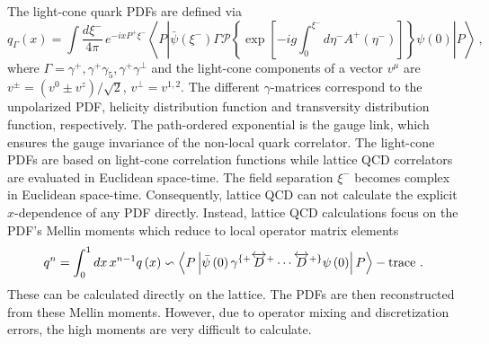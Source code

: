 \documentclass[english,preprint,aps,prd,showpacs,superscriptaddress,nofootinbib,tightenlines]{revtex4}
\begin{document}
The light-cone quark PDFs are defined via~\cite{Collins:1981uw}
\begin{equation}
q_{\Gamma}\left(x\right)=\int\frac{d\xi^{-}}{4\pi}\,e^{-ixP^{+}\xi^{-}}\left\langle P\left|\bar{\psi}\left(\xi^{-}\right)\Gamma\mathcal{P}\left\{ \exp\left[-ig\int_{0}^{\xi^{-}}d\eta^{-}A^{+}(\eta^{-})\right]\right\} \psi\left(0\right)\right|P\right\rangle~,
\end{equation}
where $\Gamma=\gamma^{+},\gamma^{+}\gamma_{5},\gamma^{+}\gamma^{\perp}$ and the light-cone components of a vector $v^\mu$ are {$v^\pm=\left(v^0\pm v^z\right)/\sqrt{2}$, $v^\perp=v^{1,2}$.} The different $\gamma$-matrices
correspond to the unpolarized PDF, helicity distribution function
and transversity distribution function, respectively. The path-ordered exponential
is the gauge link, which ensures the gauge invariance of the non-local quark correlator. The
light-cone PDFs are based on light-cone correlation functions while
 lattice QCD correlators are evaluated in Euclidean space-time.    The field separation
$\xi^{-}$ becomes complex in Euclidean space-time. Consequently, lattice
QCD can not calculate  the explicit $x$-dependence of any PDF directly.
Instead, lattice QCD calculations focus on the PDF's Mellin
moments which reduce to local operator matrix elements
\begin{equation}
q^{n}=\int_{0}^{1}dx\,x^{n-1}q\left(x\right)\backsim\left\langle P\left|\bar{\psi}\left(0\right)\gamma^{\{+}\overleftrightarrow{D}^{+}\cdots\overleftrightarrow{D}^{+\}}\psi\left(0\right)\right|P\right\rangle-\rm{trace}~.\label{eq:x_Moments}
\end{equation}
These can be calculated directly on the lattice. The PDFs are then reconstructed
from these Mellin moments. However, due to operator mixing and discretization errors, the high moments are very difficult
to calculate.
\end{document}
